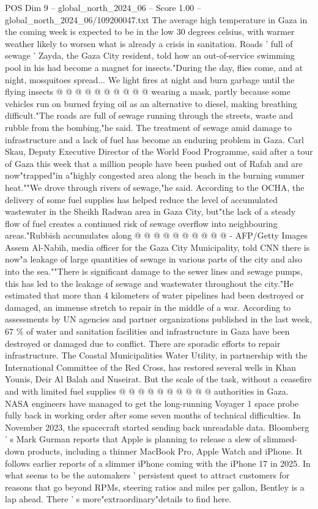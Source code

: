 \begin{textsample}{POS Dim 9 – global\_north\_2024\_06 – Score 1.00 – global\_north\_2024\_06/109200047.txt}
The average high temperature in Gaza in the coming week is expected to be in the low 30 degrees celsius, with warmer weather likely to worsen what is already a crisis in sanitation.
Roads ' full of sewage ' Zayda, the Gaza City resident, told how an out-of-service swimming pool in his had become a magnet for insects."During the day, flies come, and at night, mosquitoes spread...
We light fires at night and burn garbage until the flying insects @ @ @ @ @ @ @ @ @ @ wearing a mask, partly because some vehicles run on burned frying oil as an alternative to diesel, making breathing difficult."The roads are full of sewage running through the streets, waste and rubble from the bombing,"he said.
The treatment of sewage amid damage to infrastructure and a lack of fuel has become an enduring problem in Gaza.
Carl Skau, Deputy Executive Director of the World Food Programme, said after a tour of Gaza this week that a million people have been pushed out of Rafah and are now"trapped"in a"highly congested area along the beach in the burning summer heat.""We drove through rivers of sewage,"he said.
According to the OCHA, the delivery of some fuel supplies has helped reduce the level of accumulated wastewater in the Sheikh Radwan area in Gaza City, but"the lack of a steady flow of fuel creates a continued risk of sewage overflow into neighbouring areas."Rubbish accumulates along @ @ @ @ @ @ @ @ @ @ - AFP/Getty Images Assem Al-Nabih, media officer for the Gaza City Municipality, told CNN there is now"a leakage of large quantities of sewage in various parts of the city and also into the sea.""There is significant damage to the sewer lines and sewage pumps, this has led to the leakage of sewage and wastewater throughout the city."He estimated that more than 4 kilometers of water pipelines had been destroyed or damaged, an immense stretch to repair in the middle of a war.
According to assessments by UN agencies and partner organizations published in the last week, 67 \% of water and sanitation facilities and infrastructure in Gaza have been destroyed or damaged due to conflict.
There are sporadic efforts to repair infrastructure.
The Coastal Municipalities Water Utility, in partnership with the International Committee of the Red Cross, has restored several wells in Khan Younis, Deir Al Balah and Nuseirat.
But the scale of the task, without a ceasefire and with limited fuel supplies @ @ @ @ @ @ @ @ @ @ authorities in Gaza.
NASA engineers have managed to get the long-running Voyager 1 space probe fully back in working order after some seven months of technical difficulties.
In November 2023, the spacecraft started sending back unreadable data.
Bloomberg ' s Mark Gurman reports that Apple is planning to release a slew of slimmed-down products, including a thinner MacBook Pro, Apple Watch and iPhone.
It follows earlier reports of a slimmer iPhone coming with the iPhone 17 in 2025.
In what seems to be the automakers ' persistent quest to attract customers for reasons that go beyond RPMs, steering ratios and miles per gallon, Bentley is a lap ahead.
There ' s more"extraordinary"details to find here.

\end{textsample}
